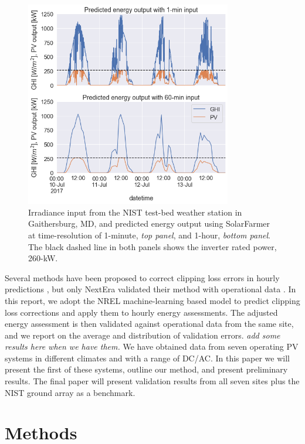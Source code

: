 \documentclass[conference]{IEEEtran}
\begin{document}
\begin{figure}[htbp]
\centerline{\includegraphics[width=9cm]{hourly_v_1-min_clipping.png}}
\caption{Irradiance input from the NIST test-bed weather station in Gaithersburg, MD, and predicted energy output using SolarFarmer at time-resolution of 1-minute, \textit{top panel}, and 1-hour, \textit{bottom panel}. The black dashed line in both panels shows the inverter rated power, 260-kW.}
\label{fig:irradiance-and-power}
\end{figure}

Several methods have been proposed to correct clipping loss errors in hourly predictions \cite{Cormode2019,Kharait,Anderson2020,Bradford}, but only NextEra validated their method with operational data \cite{Bradford}. In this report, we adopt the NREL machine-learning based model \cite{Anderson2020} to predict clipping loss corrections and apply them to hourly energy assessments. The adjusted energy assessment is then validated against operational data from the same site, and we report on the average and distribution of validation errors. \textit{\color{red}add some results here when we have them.} We have obtained data from seven operating PV systems in different climates and with a range of DC/AC. In this paper we will present the first of these systems, outline our method, and present preliminary results. The final paper will present validation results from all seven sites plus the NIST ground array \cite{Boyd2017b} as a benchmark.

\section{Methods}
\end{document}
